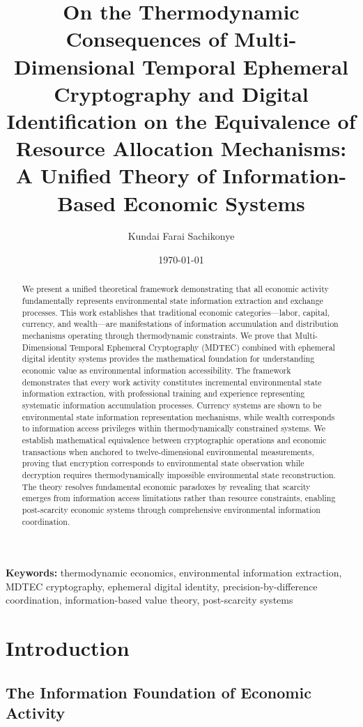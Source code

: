 \documentclass[12pt,a4paper]{article}
\title{\textbf{On the Thermodynamic Consequences of Multi-Dimensional Temporal Ephemeral Cryptography and Digital Identification on the Equivalence of Resource Allocation Mechanisms: A Unified Theory of Information-Based Economic Systems}}
\author{Kundai Farai Sachikonye}
\date{\today}
\begin{document}
\maketitle

\begin{abstract}
We present a unified theoretical framework demonstrating that all economic activity fundamentally represents environmental state information extraction and exchange processes. This work establishes that traditional economic categories—labor, capital, currency, and wealth—are manifestations of information accumulation and distribution mechanisms operating through thermodynamic constraints. We prove that Multi-Dimensional Temporal Ephemeral Cryptography (MDTEC) combined with ephemeral digital identity systems provides the mathematical foundation for understanding economic value as environmental information accessibility. The framework demonstrates that every work activity constitutes incremental environmental state information extraction, with professional training and experience representing systematic information accumulation processes. Currency systems are shown to be environmental state information representation mechanisms, while wealth corresponds to information access privileges within thermodynamically constrained systems. We establish mathematical equivalence between cryptographic operations and economic transactions when anchored to twelve-dimensional environmental measurements, proving that encryption corresponds to environmental state observation while decryption requires thermodynamically impossible environmental state reconstruction. The theory resolves fundamental economic paradoxes by revealing that scarcity emerges from information access limitations rather than resource constraints, enabling post-scarcity economic systems through comprehensive environmental information coordination.
\end{abstract}

\textbf{Keywords:} thermodynamic economics, environmental information extraction, MDTEC cryptography, ephemeral digital identity, precision-by-difference coordination, information-based value theory, post-scarcity systems

\section{Introduction}

\subsection{The Information Foundation of Economic Activity}
\end{document}

